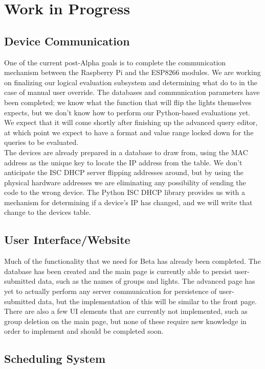 \documentclass[oneside,openright]{book}
\begin{document}
\section{Work in Progress}

\subsection{Device Communication}

One of the current post-Alpha goals is to complete the communication mechanism
between the Raspberry Pi and the ESP8266 modules. We are working on finalizing
our logical evaluation subsystem and determining what do to in the case of
manual user override. The databases and communication parameters have been
completed; we know what the function that will flip the lights themselves
expects, but we don't know how to perform our Python-based evaluations yet. We
expect that it will come shortly after finishing up the advanced query editor,
at which point we expect to have a format and value range locked down for the
queries to be evaluated.\\

The devices are already prepared in a database to draw from, using the MAC
address as the unique key to locate the IP address from the table. We don't
anticipate the ISC DHCP server flipping addresses around, but by using the
physical hardware addresses we are eliminating any possibility of sending the
code to the wrong device. The Python ISC DHCP library provides us with a
mechanism for determining if a device's IP has changed, and we will write that
change to the devices table.

\subsection{User Interface/Website}

Much of the functionality that we need for Beta has already been completed.
The database has been created and the main page is currently able to persist
user-submitted data, such as the names of groups and lights.  The advanced page
has yet to actually perform any server communication for persistence of
user-submitted data, but the implementation of this will be similar to the
front page.  There are also a few UI elements that are currently not
implemented, such as group deletion on the main page, but none of these require
new knowledge in order to implement and should be completed soon.

\subsection{Scheduling System}
\end{document}
